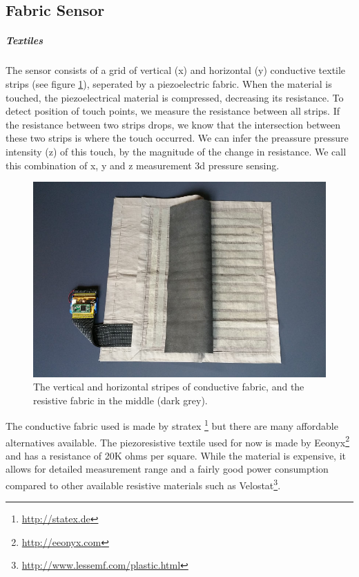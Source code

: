 \documentclass{sigchi-ext}
\begin{document}
\subsection{Fabric Sensor}
\subparagraph{Textiles}
The sensor consists of a grid of vertical (x) and horizontal (y) conductive textile strips (see figure \ref{fig:inside}), seperated by a piezoelectric fabric. When the material is touched, the piezoelectrical material is compressed, decreasing its resistance.
To detect position of touch points, we measure the resistance between all strips. If the resistance between two strips drops, we know that the intersection between these two strips is where the touch occurred. We can infer the preassure pressure intensity (z) of this touch, by the magnitude of the change in resistance. We call this combination of x, y and z measurement 3d pressure sensing.

\begin{figure}[h!]
    \centering
    \includegraphics[width=\columnwidth]{figures/inside}
    \caption{The vertical and horizontal stripes of conductive fabric,
    and the resistive fabric in the middle (dark grey).}\label{fig:inside}
\end{figure}

The conductive fabric used is made by stratex \footnote{\url{http://statex.de}} but there are many affordable alternatives available.
The piezoresistive textile used for now is made by Eeonyx\footnote{\url{http://eeonyx.com}} and has a resistance of 20K ohms per square. While the material is expensive, it allows for detailed measurement range and a fairly good power consumption compared to other available resistive materials such as Velostat\footnote{\url{http://www.lessemf.com/plastic.html}}.
\end{document}

